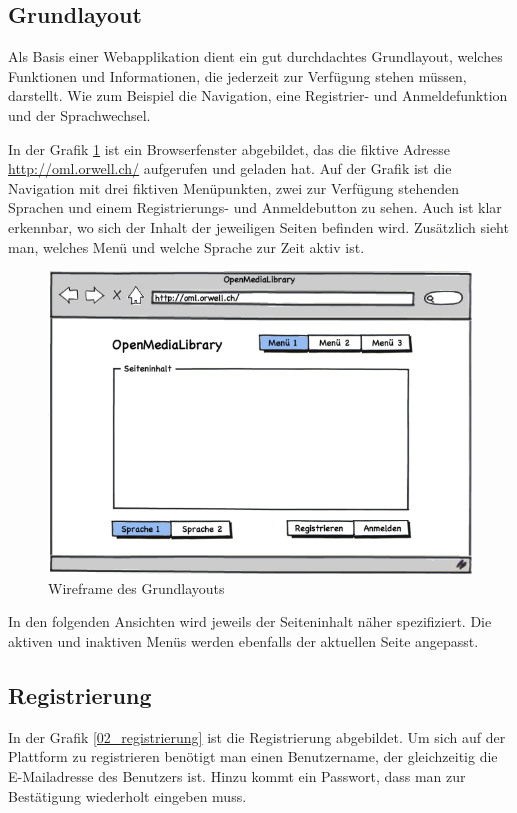 \subsection{Grundlayout}
Als Basis einer Webapplikation dient ein gut durchdachtes Grundlayout, welches
Funktionen und Informationen, die jederzeit zur Verfügung stehen müssen, darstellt.
Wie zum Beispiel die Navigation, eine Registrier- und Anmeldefunktion und der Sprachwechsel.

In der Grafik \ref{01_grundlayout} ist ein Browserfenster abgebildet, das die
fiktive Adresse \url{http://oml.orwell.ch/} aufgerufen und geladen hat. Auf der Grafik
ist die Navigation mit drei fiktiven Menüpunkten, zwei zur Verfügung stehenden 
Sprachen und einem Registrierungs- und Anmeldebutton zu sehen. Auch ist klar erkennbar,
wo sich der Inhalt der jeweiligen Seiten befinden wird. Zusätzlich sieht man, welches
Menü und welche Sprache zur Zeit aktiv ist.

\begin{figure}[ht]
    \begin{center}
        \includegraphics[width=1\textwidth,angle=0]{./wireframes/01_grundlayout.png}
        \caption{Wireframe des Grundlayouts}
        \label{01_grundlayout}
    \end{center}
\end{figure}

In den folgenden Ansichten wird jeweils der Seiteninhalt näher spezifiziert. Die
aktiven und inaktiven Menüs werden ebenfalls der aktuellen Seite angepasst.

\subsection{Registrierung}
In der Grafik \ref{02_registrierung} ist die Registrierung abgebildet. Um sich
auf der Plattform zu registrieren benötigt man einen Benutzername, der gleichzeitig
die E-Mailadresse des Benutzers ist. Hinzu kommt ein Passwort, dass man zur 
Bestätigung wiederholt eingeben muss.

